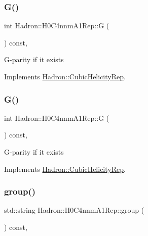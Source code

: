 \subsubsection{\texorpdfstring{G()}{G()}\hspace{0.1cm}{\footnotesize\ttfamily [1/2]}}
{\footnotesize\ttfamily int Hadron\+::\+H0\+C4nnm\+A1\+Rep\+::G (\begin{DoxyParamCaption}{ }\end{DoxyParamCaption}) const\hspace{0.3cm}{\ttfamily [inline]}, {\ttfamily [virtual]}}

G-\/parity if it exists 

Implements \mbox{\hyperlink{structHadron_1_1CubicHelicityRep_a50689f42be1e6170aa8cf6ad0597018b}{Hadron\+::\+Cubic\+Helicity\+Rep}}.

\mbox{\label{structHadron_1_1H0C4nnmA1Rep_a4b3dc2356d50c1fafd1c07098bcf019d}} 
\subsubsection{\texorpdfstring{G()}{G()}\hspace{0.1cm}{\footnotesize\ttfamily [2/2]}}
{\footnotesize\ttfamily int Hadron\+::\+H0\+C4nnm\+A1\+Rep\+::G (\begin{DoxyParamCaption}{ }\end{DoxyParamCaption}) const\hspace{0.3cm}{\ttfamily [inline]}, {\ttfamily [virtual]}}

G-\/parity if it exists 

Implements \mbox{\hyperlink{structHadron_1_1CubicHelicityRep_a50689f42be1e6170aa8cf6ad0597018b}{Hadron\+::\+Cubic\+Helicity\+Rep}}.

\mbox{\label{structHadron_1_1H0C4nnmA1Rep_a285f5eda1399e94ac66264af1a41c08a}} 
\subsubsection{\texorpdfstring{group()}{group()}\hspace{0.1cm}{\footnotesize\ttfamily [1/3]}}
{\footnotesize\ttfamily std\+::string Hadron\+::\+H0\+C4nnm\+A1\+Rep\+::group (\begin{DoxyParamCaption}{ }\end{DoxyParamCaption}) const\hspace{0.3cm}{\ttfamily [inline]}, {\ttfamily [virtual]}}

